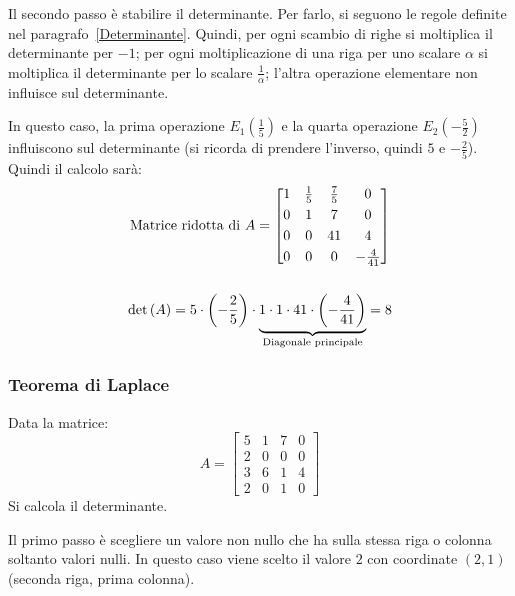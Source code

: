 \documentclass[a4paper]{article}
\makeatletter
\newenvironment{rowequmatbra}[1]{\left[\array{@{}#1@{}}}{\endarray\right]}
\makeatother
\begin{document}
	Il \textcolor{Red3}{secondo passo} è stabilire il determinante. Per farlo, si seguono le regole definite nel paragrafo~\ref{Determinante}. Quindi, per ogni scambio di righe si moltiplica il determinante per $-1$; per ogni moltiplicazione di una riga per uno scalare $\alpha$ si moltiplica il determinante per lo scalare $\frac{1}{\alpha}$; l'altra operazione elementare non influisce sul determinante.\newline
	
	\noindent
	In questo caso, la prima operazione $E_{1}\left(\frac{1}{5}\right)$ e la quarta operazione $E_{2}\left(-\frac{5}{2}\right)$ influiscono sul determinante (si ricorda di prendere l'inverso, quindi $5$ e $-\frac{2}{5}$). Quindi il calcolo sarà:
	\begin{gather*}
		\text{Matrice ridotta di } A = \begin{rowequmatbra}{cccc}
			1	&  \frac{1}{5}	& \frac{7}{5}	& 0 \\ [0.3em]
			0 	&  1			& 7				& 0 \\ [0.3em]
			0	&  0			& 41			& 4 \\ [0.3em]
			0	&  0			& 0				& -\frac{4}{41}
		\end{rowequmatbra} \\
		\\
		\det\left(A\right) = 5 \cdot \left(-\dfrac{2}{5}\right) \cdot \underbrace{1 \cdot 1 \cdot 41 \cdot \left(-\dfrac{4}{41}\right)}_{\text{Diagonale principale}} = 8
	\end{gather*}\newpage
	
	\subsubsection{Teorema di Laplace}
	
	Data la matrice:
	\begin{equation*}
		A = \begin{bmatrix}
			5 & 1 & 7 & 0 \\
			2 & 0 & 0 & 0 \\
			3 & 6 & 1 & 4 \\
			2 & 0 & 1 & 0
		\end{bmatrix}
	\end{equation*}
	Si calcola il determinante.\newline
	
	\noindent
	Il \textcolor{Red3}{primo passo} è scegliere un valore non nullo che ha sulla stessa riga o colonna soltanto valori nulli. In questo caso viene scelto il valore $2$ con coordinate $\left(2,1\right)$ (seconda riga, prima colonna).\newline
	
\end{document}
